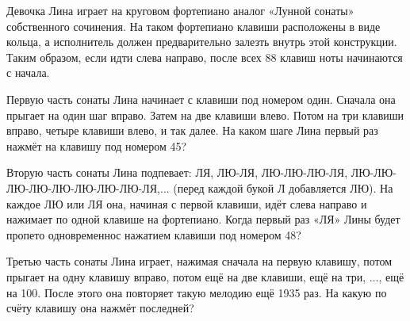 ﻿

\noindent Девочка Лина играет на круговом фортепиано аналог «Лунной сонаты» собственного сочинения. На таком фортепиано клавиши расположены в виде кольца, а исполнитель должен предварительно залезть внутрь этой конструкции. Таким образом, если идти слева направо, после всех 88 клавиш ноты начинаются с начала.
\begin{itemize}

\itA Первую часть сонаты Лина начинает с клавиши под номером один. Сначала она прыгает на один шаг вправо. Затем на две клавиши влево. Потом на три клавиши вправо, четыре клавиши влево, и так далее. На каком шаге Лина первый раз нажмёт на клавишу под номером 45?

\itB Вторую часть сонаты Лина подпевает: ЛЯ, ЛЮ-ЛЯ, ЛЮ-ЛЮ-ЛЮ-ЛЯ, ЛЮ-ЛЮ-ЛЮ-ЛЮ-ЛЮ-ЛЮ-ЛЮ-ЛЮ-ЛЯ,... (перед каждой букой Л добавляется ЛЮ). На каждое ЛЮ или ЛЯ она, начиная с первой клавиши, идёт слева направо и нажимает по одной клавише на фортепиано. Когда первый раз «ЛЯ» Лины будет пропето одновременно\linebreak с нажатием клавиши под номером 48?

\itC Третью часть сонаты Лина играет, нажимая сначала на первую клавишу, потом прыгает на одну клавишу вправо, потом ещё на две клавиши, ещё на три, $\ldots$, ещё на 100. После этого она повторяет такую мелодию ещё 1935 раз. На какую по счёту клавишу она нажмёт последней?
\end{itemize}